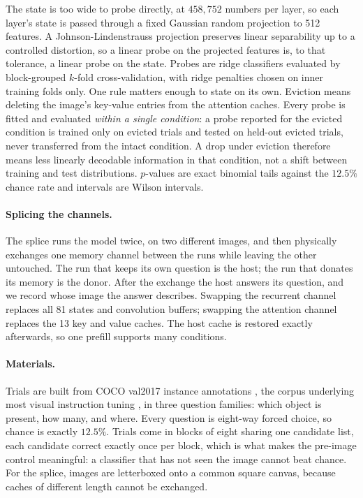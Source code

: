 The state is too wide to probe directly, at $458{,}752$ numbers per layer, so
each layer's state is passed through a fixed Gaussian random projection to 512
features. A Johnson-Lindenstrauss projection preserves linear separability up
to a controlled distortion, so a linear probe on the projected features is, to
that tolerance, a linear probe on the state. Probes are ridge classifiers
evaluated by block-grouped $k$-fold cross-validation, with ridge penalties
chosen on inner training folds only. One rule matters enough to state on its
own. Eviction means deleting the image's key-value entries from the attention
caches. Every probe is fitted and evaluated \emph{within a single condition}:
a probe reported for the evicted condition is trained only on evicted trials
and tested on held-out evicted trials, never transferred from the intact
condition. A drop under eviction therefore means less linearly decodable
information in that condition, not a shift between training and test
distributions. $p$-values are exact binomial
tails against the $12.5\%$ chance rate and intervals are Wilson intervals.

\paragraph{Splicing the channels.} The splice runs the model twice, on two
different images, and then physically exchanges one memory channel between the
runs while leaving the other untouched. The run that keeps its own question is
the host; the run that donates its memory is the donor. After the exchange the
host answers its question, and we record whose image the answer describes.
Swapping the recurrent channel replaces all 81 states and convolution buffers;
swapping the attention channel replaces the 13 key and value caches. The host
cache is restored exactly afterwards, so one prefill supports many conditions.

\paragraph{Materials.} Trials are built from COCO val2017 instance annotations
\citep{lin2014coco}, the corpus underlying most visual instruction tuning
\citep{liu2023llava}, in three question families: which object is present, how
many, and where. Every question is eight-way forced choice, so chance is
exactly $12.5\%$. Trials come in blocks of eight sharing one candidate list,
each candidate correct exactly once per block, which is what makes the
pre-image control meaningful: a classifier that has not seen the image cannot
beat chance. For the splice, images are letterboxed onto a common square
canvas, because caches of different length cannot be exchanged.

